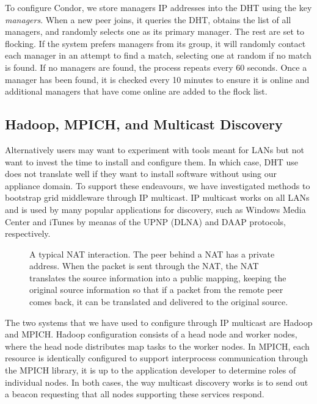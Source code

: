 \documentclass[conference]{IEEEtran}
\begin{document}
To configure Condor, we store managers IP addresses into the DHT using the key
\emph{managers}.  When a new peer joins, it queries the DHT, obtains the list
of all managers, and randomly selects one as its primary manager.  The rest are
set to flocking.  If the system prefers managers from its group, it will
randomly contact each manager in an attempt to find a match, selecting one at
random if no match is found.  If no managers are found, the process repeats
every 60 seconds.  Once a manager has been found, it is checked every 10
minutes to ensure it is online and additional managers that have come online
are added to the flock list.

\subsection{Hadoop, MPICH, and Multicast Discovery}

Alternatively users may want to experiment with tools meant for LANs but not
want to invest the time to install and configure them.  In which case, DHT use
does not translate well if they want to install software without using our
appliance domain.  To support these endeavours, we have investigated methods to
bootstrap grid middleware through IP multicast.  IP multicast works on all LANs
and is used by many popular applications for discovery, such as Windows Media
Center and iTunes by meanas of the UPNP (DLNA) and DAAP protocols,
respectively.

\begin{figure*}[h!t!]
\centering
{}
\caption{A typical NAT interaction. The peer behind a NAT has a private address.
When the packet is sent through the NAT, the NAT translates the source information
into a public mapping, keeping the original source information so that if a
packet from the remote peer comes back, it can be translated and delivered to
the original source.}
\label{fig:nat}
\end{figure*}

The two systems that we have used to configure through IP multicast are Hadoop
and MPICH.  Hadoop configuration consists of a head node and worker nodes,
where the head node distributes map tasks to the worker nodes.  In MPICH, each
resource is identically configured to support interprocess communication
through the MPICH library, it is up to the application developer to determine
roles of individual nodes.  In both cases, the way multicast discovery works is
to send out a beacon requesting that all nodes supporting these services
respond.
\end{document}
